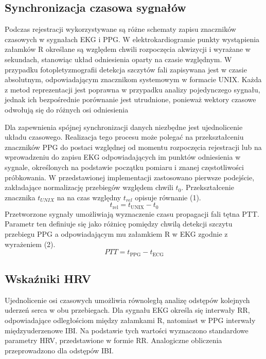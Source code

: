 \documentclass[journal]{IEEEtran}
\begin{document}
\subsection{Synchronizacja czasowa sygnałów}
Podczas rejestracji wykorzystywane są różne schematy zapisu znaczników czasowych w sygnałach EKG i PPG. W elektrokardiogramie punkty wystąpienia załamków R określane są względem chwili rozpoczęcia akwizycji i wyrażane w sekundach, stanowiąc układ odniesienia oparty na czasie względnym.
W przypadku fotopletyzmografii detekcja szczytów fali zapisywana jest w czasie absolutnym, odpowiadającym znacznikom systemowym w formacie UNIX. Każda z metod reprezentacji jest poprawna w przypadku analizy pojedynczego sygnału, jednak ich bezpośrednie porównanie jest utrudnione, ponieważ wektory czasowe odwołują się do różnych osi odniesienia

Dla zapewnienia spójnej synchronizacji danych niezbędne jest ujednolicenie układu czasowego.
Realizacja tego procesu może polegać na przekształceniu znaczników PPG do postaci względnej od momentu rozpoczęcia rejestracji
lub na wprowadzeniu do zapisu EKG odpowiadających im punktów odniesienia w sygnale, określonych na podstawie początku pomiaru i znanej częstotliwości próbkowania.
W przedstawionej implementacji zastosowano pierwsze podejście, zakładające normalizację przebiegów względem chwili $t_{0}$. 
\newpage
Przekształcenie znacznika $t_{UNIX}$ na na czas względny $t_{rel}$ opisuje równanie (1).
\begin{equation}
t_{\mathrm{rel}} = t_{\mathrm{UNIX}} - t_{0}
\end{equation}
Przetworzone sygnały umożliwiają wyznaczenie czasu propagacji fali tętna PTT. Parametr ten definiuje się jako różnicę pomiędzy chwilą detekcji szczytu przebiegu PPG a odpowiadającym mu załamkiem R w EKG zgodnie z wyrażeniem (2).
\begin{equation}
PTT = t_{\mathrm{PPG}} - t_{\mathrm{ECG}}
\end{equation}


\subsection{Wskaźniki HRV}
Ujednolicenie osi czasowych umożliwia równoległą analizę odstępów kolejnych uderzeń serca w obu przebiegach. Dla sygnału EKG określa się interwały RR, odpowiadające odległościom między załamkami R, natomiast w PPG interwały międzyuderzenowe IBI. Na podstawie tych wartości wyznaczono standardowe parametry HRV, przedstawione w formie RR. Analogiczne obliczenia przeprowadzono dla odstępów IBI.
\end{document}
